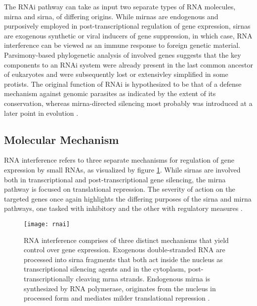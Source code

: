 The RNAi pathway can take as input two separate types of RNA molecules, \gls{mirna} and \gls{sirna}, of differing origins. While \glspl{mirna} are endogenous and purposively employed in post-transcriptional regulation of gene expression, \glspl{sirna} are exogenous synthetic or viral inducers of gene suppression, in which case, RNA interference can be viewed as an immune response to foreign genetic material. Parsimony-based phylogenetic analysis of involved genes suggests that the key components to an RNAi system were already present in the last common ancestor of eukaryotes and were subsequently lost or extensivley simplified in some protists. The original function of RNAi is hypothesized to be that of a defense mechanism against genomic parasites as indicated by the extent of its conservation, whereas \gls{mirna}-directed silencing most probably was introduced at a later point in evolution \citep{Cerutti2006}.

\subsection{Molecular Mechanism}
RNA interference refers to three separate mechanisms for regulation of gene expression by small RNAs, as visualized by figure \ref{fig:rnai}. While \glspl{sirna} are involved both in transcriptional and post-transcriptional gene silencing, the \gls{mirna} pathway is focused on translational repression. The severity of action on the targeted genes once again highlights the differing purposes of the \gls{sirna} and \gls{mirna} pathways, one tasked with inhibitory and the other with regulatory measures \citep{Wilson2013,Kim2007,Carthew2009}.

\begin{figure}[t]
  \centering
  \texttt{[image: rnai]}
  \caption[The three major pathways of RNA interference.]{RNA interference comprises of three distinct mechanisms that yield control over gene expression. Exogenous double-stranded RNA are processed into \gls{sirna} fragments that both act inside the nucleus as transcriptional silencing agents and in the cytoplasm, post-transcriptionally cleaving \gls{mrna} strands. Endogenous \gls{mirna} is synthesized by RNA polymerase, originates from the nucleus in processed form and mediates milder translational repression \citep{Kim2007}.}
  \label{fig:rnai}
\end{figure}


